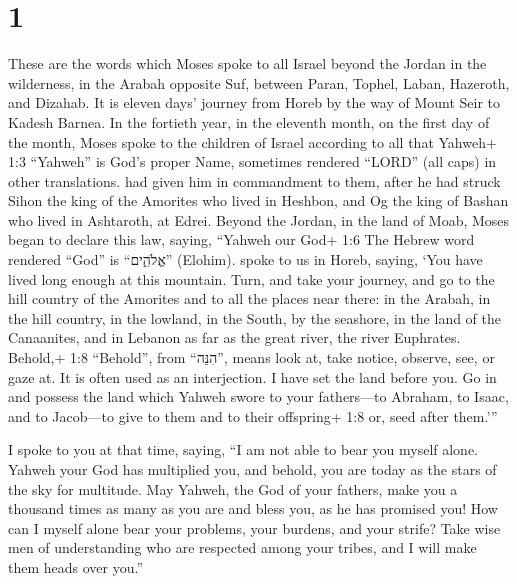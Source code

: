 \hypertarget{section}{%
\section{1}\label{section}}

 These are the words which Moses spoke to all Israel beyond
the Jordan in the wilderness, in the Arabah opposite Suf, between Paran,
Tophel, Laban, Hazeroth, and Dizahab.  It is eleven days'
journey from Horeb by the way of Mount Seir to Kadesh Barnea.
 In the fortieth year, in the eleventh month, on the first
day of the month, Moses spoke to the children of Israel according to all
that Yahweh+ 1:3 ``Yahweh'' is God's proper Name, sometimes rendered
``LORD'' (all caps) in other translations. had given him in commandment
to them,  after he had struck Sihon the king of the Amorites
who lived in Heshbon, and Og the king of Bashan who lived in Ashtaroth,
at Edrei.  Beyond the Jordan, in the land of Moab, Moses
began to declare this law, saying,  ``Yahweh our God+ 1:6
The Hebrew word rendered ``God'' is ``אֱלֹהִ֑ים'' (Elohim). spoke to us
in Horeb, saying, `You have lived long enough at this mountain.
 Turn, and take your journey, and go to the hill country of
the Amorites and to all the places near there: in the Arabah, in the
hill country, in the lowland, in the South, by the seashore, in the land
of the Canaanites, and in Lebanon as far as the great river, the river
Euphrates.  Behold,+ 1:8 ``Behold'', from ``הִנֵּה'', means
look at, take notice, observe, see, or gaze at. It is often used as an
interjection. I have set the land before you. Go in and possess the land
which Yahweh swore to your fathers---to Abraham, to Isaac, and to
Jacob---to give to them and to their offspring+ 1:8 or, seed after
them.'''

 I spoke to you at that time, saying, ``I am not able to
bear you myself alone.  Yahweh your God has multiplied you,
and behold, you are today as the stars of the sky for multitude.
 May Yahweh, the God of your fathers, make you a thousand
times as many as you are and bless you, as he has promised you!
 How can I myself alone bear your problems, your burdens,
and your strife?  Take wise men of understanding who are
respected among your tribes, and I will make them heads over you.''


